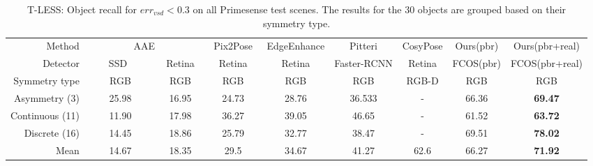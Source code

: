 \begin{table*}[t]
        \centering
        \caption{
                T-LESS: Object recall for $err_{vsd} < 0.3$ on all Primesense test scenes. The results for the $30$ objects are grouped based on their symmetry type.
        }
        \begin{tabular}{r| c c c c c c c c}
        \toprule
        Method& \multicolumn{2}{c}{AAE \cite{sundermeyer2018implicit}} & Pix2Pose \cite{park2019pix2pose}& EdgeEnhance \cite{wen2020edge}& Pitteri\cite{pitteri2019object} & CosyPose\cite{labbe2020cosypose}& Ours(pbr) & Ours(pbr+real)\\
        \cmidrule(lr){2-3}\cmidrule(lr){4-4}\cmidrule(lr){5-5}\cmidrule(lr){6-6}\cmidrule(lr){7-7}\cmidrule(lr){8-9}
        Detector&\ \ \ \ SSD\ \ \ \ \  &\ Retina\ &\ \ Retina\ \ &\ \ Retina\ \ & Faster-RCNN & Retina & FCOS(pbr) & FCOS(pbr+real)\\
        Symmetry type& RGB & RGB & RGB &RGB& RGB &RGB-D& RGB &RGB \\
        \midrule
        Asymmetry (3)&25.98&16.95&24.73&28.76&36.533&-&66.36&\textbf{69.47}\\
        Continuous (11)&11.90&17.98&36.27&39.05&46.65&-&61.52&\textbf{63.72}\\
        Discrete (16)&14.45&18.86&25.79&32.77&38.47&-&69.51&\textbf{78.02}\\
        \midrule
        Mean&14.67 &18.35 &29.5&34.67&41.27 &62.6&66.27&\textbf{71.92} \\
        \bottomrule
        \end{tabular}
\label{tab:tless_vsd}
\end{table*}

